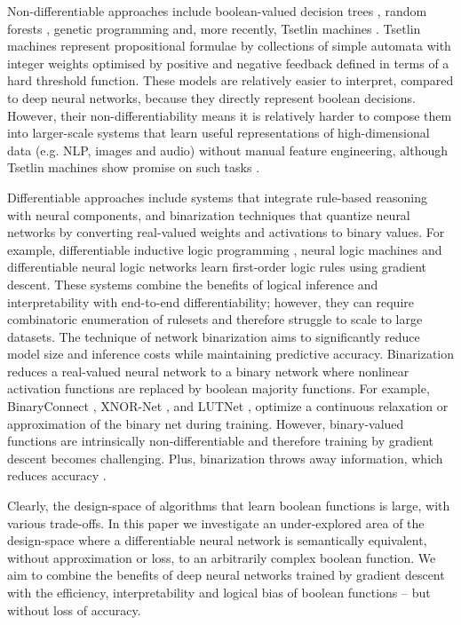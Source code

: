 \documentclass{article} %
\begin{document}
Non-differentiable approaches include boolean-valued decision trees \citep{BreiFrieStonOlsh84}, random forests \citep{598994}, genetic programming \citep{koza1992genetic} and, more recently, Tsetlin machines \cite{granmo18}. Tsetlin machines represent propositional formulae by collections of simple automata with integer weights optimised by positive and negative feedback defined in terms of a hard threshold function. These models are relatively easier to interpret, compared to deep neural networks, because they directly represent boolean decisions. However, their non-differentiability means it is relatively harder to compose them into larger-scale systems that learn useful representations of high-dimensional data (e.g. NLP, images and audio) without manual feature engineering, although Tsetlin machines show promise on such tasks \citep{Granmo2019TheCT}.

Differentiable approaches include systems that integrate rule-based reasoning with neural components, and binarization techniques that quantize neural networks by converting real-valued weights and activations to binary values. For example, differentiable inductive logic programming \citep{10.5555/3241691.3241692}, neural logic machines \citep{dong2018neural} 
and differentiable neural logic networks \cite{DBLP:phd/basesearch/Payani20} learn first-order logic rules using gradient descent. These systems combine the benefits of logical inference and interpretability with end-to-end differentiability; however, they can require combinatoric enumeration of rulesets and therefore struggle to scale to large datasets. The technique of network binarization aims to significantly reduce model size and inference costs while maintaining predictive accuracy. Binarization reduces a real-valued neural network to a binary network where nonlinear activation functions are replaced by boolean majority functions. For example, BinaryConnect \citep{10.5555/2969442.2969588}, XNOR-Net \citep{10.1007/978-3-319-46493-0_32}, and LUTNet \citep{9026948}, optimize a continuous relaxation or approximation of the binary net during training. However, binary-valued functions are intrinsically non-differentiable and therefore training by gradient descent becomes challenging. Plus, binarization throws away information, which reduces accuracy \citep{QIN2020107281}. 

Clearly, the design-space of algorithms that learn boolean functions is large, with various trade-offs. In this paper we investigate an under-explored area of the design-space where a differentiable neural network is semantically equivalent, without approximation or loss, to an arbitrarily complex boolean function. We aim to combine the benefits of deep neural networks trained by gradient descent with the efficiency, interpretability and logical bias of boolean functions -- but without loss of accuracy.
\end{document}
